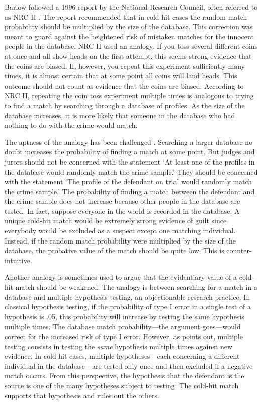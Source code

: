 \documentclass{article}
\begin{document}
Barlow followed a 1996 report by the National Research Council, often referred to as NRC II %
\citep{NRCII1996}. 
The report recommended that in cold-hit cases the random match probability %
should be multiplied by the size of the database.
 This correction was meant to guard against the heightened risk of mistaken matches  for  the innocent people in the database. 
NRC II used an analogy. 
If you toss several different coins at once and all show heads on the first attempt, this seems strong evidence that the coins are biased. If, however, you repeat this experiment sufficiently many times, it is almost certain that at some point all coins will land heads. 
This outcome should not count as evidence that the coins are biased. According to NRC II, repeating the coin toss experiment multiple times is analogous to trying to find a match by searching through a database of profiles.  As the size of the database increases,  %
 it is more likely that someone in the database who had nothing to do with the crime would  match.

The aptness of the analogy has been challenged   \citep{donnelly1999DNADatabaseSearches}. Searching a larger database no doubt increases the probability of finding a match at some point. But judges and jurors should not be concerned with %
the statement
`At least one of the profiles in the database %
would randomly match the crime sample.' %
They should be concerned with %
the statement `The profile of the  defendant on trial would randomly match the crime sample.' The probability of finding a match between the  defendant and the crime sample does not increase because other people in the database are tested. In fact, suppose everyone in the world is recorded in the database. A unique cold-hit match would be extremely strong evidence of guilt since everybody would be excluded as a suspect except one matching individual. Instead, if the random match probability were multiplied by the size of the database, the probative value of the match should be quite low. This is counter-intuitive.%


Another analogy is sometimes used to argue that the evidentiary value of a cold-hit match should be weakened. The analogy is between searching for a match in a database and multiple hypothesis testing, an objectionable  research practice. In  classical hypothesis testing, if the probability of type I error in a single test of a hypothesis is .05, this probability will increase by testing the same hypothesis multiple times. The database match probability---the argument goes---would correct for the increased risk of type I error. %
However, as \citet{balding2002DNDatabaseSearch,Balding2005Weight}  points out, multiple testing consists in testing the \textit{same} hypothesis  multiple times against new evidence. In cold-hit cases, 
multiple hypotheses---each concerning a different individual in the database---are tested only once and then excluded if a negative match occurs. 
From this perspective, the hypothesis that the defendant is the source is one of the many hypotheses subject to testing. The cold-hit match supports that hypothesis and rules out the others. 
\end{document}
